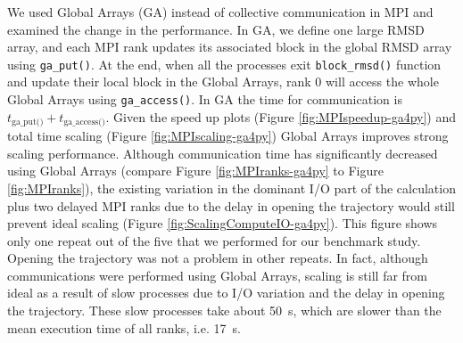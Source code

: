 We used Global Arrays (GA) \cite{GA, GAiN} instead of collective communication in MPI and examined the change in the performance. 
In GA, we define one large RMSD array, and each MPI rank updates its associated block in the global RMSD array using \texttt{ga\_put()}. 
At the end, when all the processes exit \texttt{block\_rmsd()} function and update their local block in the Global Arrays, rank 0 will access the whole Global Arrays using \texttt{ga\_access()}.
In GA the time for communication is \texttt{$t_{\text{ga\_put()}}+t_{\text{ga\_access()}}$}.
Given the speed up plots (Figure \ref{fig:MPIspeedup-ga4py}) and total time scaling (Figure \ref{fig:MPIscaling-ga4py}) Global Arrays improves strong scaling performance.
Although communication time has significantly decreased using Global Arrays (compare Figure \ref{fig:MPIranks-ga4py} to Figure \ref{fig:MPIranks}),
the existing variation in the dominant I/O part of the calculation plus two delayed MPI ranks due to the delay in opening the trajectory would still prevent ideal scaling (Figure \ref{fig:ScalingComputeIO-ga4py}).
This figure shows only one repeat out of the five that we performed for our benchmark study. 
Opening the trajectory was not a problem in other repeats.
In fact, although communications were performed using Global Arrays, scaling is still far from ideal as a result of slow processes due to I/O variation and the delay in opening the trajectory.
These slow processes take about 50~s, which are slower than the mean execution time of all ranks, i.e. 17~s. 

